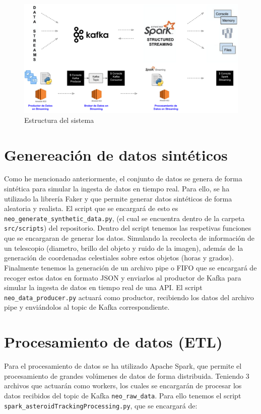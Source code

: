 \documentclass[12pt]{article}
\begin{document}
\begin{figure}[h!]
    \centering
    \includegraphics[width=.7\textwidth]{assets/proyecto/estructura.png}
    \caption{Estructura del sistema}
    \label{fig:my_label}
\end{figure}

\section{Genereación de datos sintéticos}

Como he mencionado anteriormente, el conjunto de datos se genera de forma sintética para simular la ingesta de datos en tiempo real.
Para ello, se ha utilizado la librería Faker \cite[Faker]{joke2k-faker} y \cite[numpy]{numpy} que permite generar datos sintéticos 
de forma aleatoria y realista. El script que se encargará de esto es \texttt{neo\_generate\_synthetic\_data.py}, (el cual se
encuentra dentro de la carpeta \texttt{src/scripts}) del repositorio. Dentro del script tenemos las respetivas funciones
que se encargaran de generar los datos. Simulando la recolecta de información de un telescopio (diametro, brillo del objeto y 
ruido de la imagen), además de la generación de coordenadas celestiales sobre estos objetos (horas y grados).
\\
Finalmente tenemos la generación de un archivo pipe o FIFO que se encargará de recoger estos datos en formato JSON y enviarlos 
al productor de Kafka para simular la ingesta de datos en tiempo real de una API. El script \texttt{neo\_data\_producer.py} 
actuará como productor, recibiendo los datos del archivo pipe y enviándolos al topic de Kafka correspondiente.

\section{Procesamiento de datos (ETL)}

Para el procesamiento de datos se ha utilizado Apache Spark, que permite el procesamiento de grandes volúmenes de datos de 
forma distribuida. Teniendo 3 archivos que actuarán como workers, los cuales se encargarán de procesar los datos
recibidos del topic de Kafka \texttt{neo\_raw\_data}. Para ello tenemos el script \texttt{spark\_asteroidTrackingProcessing.py}, que se
encargará de:
\end{document}
